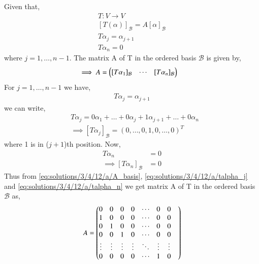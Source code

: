 Given that, 
\begin{align}
    T: V \xrightarrow{} V \\
    [T(\alpha)]_\mathcal{B} = A[\alpha]_{\mathcal{B}} \\
    T\alpha_{j} = \alpha_{j+1} \\
    T\alpha_{n} = 0
\end{align}
where $j = 1,\ldots, n-1$. 
The matrix A of T in the ordered basis $\mathcal{B}$ is given by, 
\begin{align}
    \implies A &= \begin{pmatrix}[T\alpha_1]_{\mathcal{B}} & \cdots & [T\alpha_n]_{\mathcal{B}}\end{pmatrix} \label{eq:solutions/3/4/12/a/A_basis}
\end{align}
For $j = 1,\ldots, n-1$ we have,
\begin{align}
    T\alpha_{j} = \alpha_{j+1}
\end{align}
we can write, 
\begin{align}
    &T\alpha_{j} = 0\alpha_{1} + \ldots + 0\alpha_{j} + 1\alpha_{j+1} + \ldots + 0\alpha_{n} \\
    &\implies [T\alpha_{j}]_{\mathcal{B}} = (0,\ldots,0, 1,0,\ldots, 0)^{T} \label{eq:solutions/3/4/12/a/talpha_j}
\end{align}
where 1 is in ($j+1$)th position. Now,
\begin{align}
    T\alpha_{n} &= 0 \\
    \implies [T\alpha_{n}]_{\mathcal{B}} &= 0 \label{eq:solutions/3/4/12/a/talpha_n}
\end{align}
Thus from \eqref{eq:solutions/3/4/12/a/A_basis}, \eqref{eq:solutions/3/4/12/a/talpha_j} and \eqref{eq:solutions/3/4/12/a/talpha_n} we get matrix A of T in the ordered basis $\mathcal{B}$ as,
\begin{align}
    A = \begin{pmatrix}0&0&0&0&\cdots&0&0& \\ 1&0&0&0&\cdots&0&0 \\ 0&1&0&0&\cdots&0&0 \\ 0&0&1&0&\cdots&0&0 \\ \vdots&\vdots&\vdots&\vdots&\ddots&\vdots&\vdots \\ 0&0&0&0&\cdots&1&0\end{pmatrix}
\end{align}

